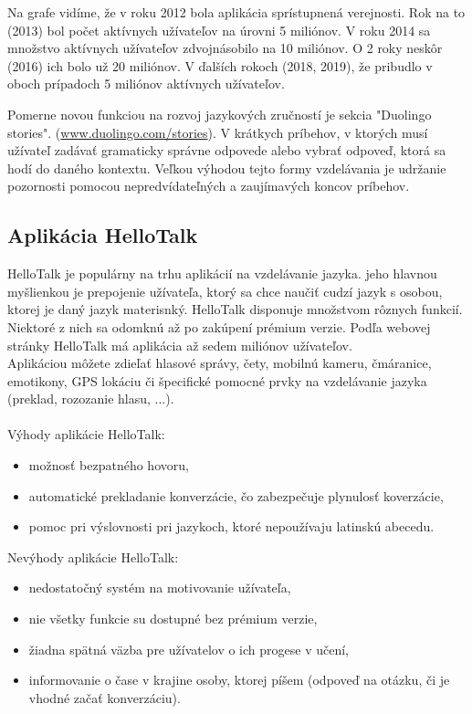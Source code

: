 \documentclass[10pt,oneside,slovak,a4paper]{article}
\begin{document}
Na grafe vidíme, že v roku 2012 bola aplikácia sprístupnená verejnosti. Rok na to (2013) bol počet aktívnych užívateľov na úrovni 5 miliónov. V roku 2014 sa množstvo aktívnych užívateľov zdvojnásobilo na 10 miliónov. O 2 roky neskôr (2016) ich bolo už 20 miliónov. V ďalších rokoch (2018, 2019), že pribudlo v oboch prípadoch 5 miliónov aktívnych užívateľov.

Pomerne novou funkciou na rozvoj jazykových zručností je sekcia "Duolingo stories". (\href{https://www.duolingo.com/stories/}{www.duolingo.com/stories}). V krátkych príbehov, v ktorých musí užívateľ zadávať gramaticky správne odpovede alebo vybrať odpoveď, ktorá sa hodí do daného kontextu. Veľkou výhodou tejto formy vzdelávania je udržanie pozornosti pomocou nepredvídateľných a zaujímavých koncov príbehov. 

\subsection{Aplikácia HelloTalk} %
HelloTalk je populárny na trhu aplikácií na vzdelávanie jazyka. jeho hlavnou myšlienkou je prepojenie užívateľa, ktorý sa chce naučiť cudzí jazyk s osobou, ktorej je daný jazyk materisnký. HelloTalk disponuje množstvom rôznych funkcií. Niektoré z nich sa odomknú až po zakúpení prémium verzie. Podľa webovej stránky HelloTalk má aplikácia až sedem miliónov užívateľov.\cite{hellotalk}\\
Aplikáciou môžete zdieľať hlasové správy, čety, mobilnú kameru, čmáranice, emotikony, GPS lokáciu či špecifické pomocné prvky na vzdelávanie jazyka (preklad, rozozanie hlasu, ...).\cite{hellotalk}\\\\
Výhody aplikácie HelloTalk:
\begin{itemize}
\item možnosť bezpatného hovoru,
\item automatické prekladanie konverzácie, čo zabezpečuje plynulosť koverzácie,
\item pomoc pri výslovnosti pri jazykoch, ktoré nepoužívaju latinskú abecedu.\cite{hellotalk}
\end{itemize}
Nevýhody aplikácie HelloTalk:
\begin{itemize}
\item nedostatočný systém na motivovanie užívateľa,
\item nie všetky funkcie su dostupné bez prémium verzie,
\item žiadna spätná väzba pre užívatelov o ich progese v učení,
\item informovanie o čase v krajine osoby, ktorej píšem (odpoveď na otázku, či je vhodné začať konverzáciu).\cite{hellotalk}
\end{itemize}
\end{document}
